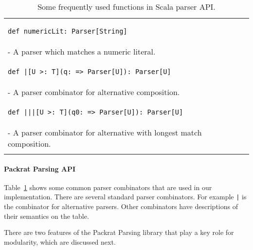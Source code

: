 \begin{table}[t]
\begin{tabular}{l}
\hline
\begin{lstlisting}
def numericLit: Parser[String]
\end{lstlisting} \\
\hspace{.2in}- A parser which matches a numeric literal. \\
\hline
\begin{lstlisting}
def |[U >: T](q: => Parser[U]): Parser[U]
\end{lstlisting} \\
\hspace{.2in}- A parser combinator for alternative composition. \\
\hline
\begin{lstlisting}
def |||[U >: T](q0: => Parser[U]): Parser[U]
\end{lstlisting} \\
\hspace{.2in}- A parser combinator for alternative with longest match composition. \\
\hline \\
\end{tabular}
\caption{Some frequently used functions in Scala parser API.}\label{tab1}
\end{table}

\paragraph{Packrat Parsing API} Table~\ref{tab1} shows some common parser combinators
that are used in our implementation.  There are several standard
parser combinators. For example \lstinline{|} is the combinator for
alternative parsers. Other combinators have descriptions of their
semantics on the table.

There are two features of the Packrat Parsing library that play a key role
for modularity, which are discussed next.

